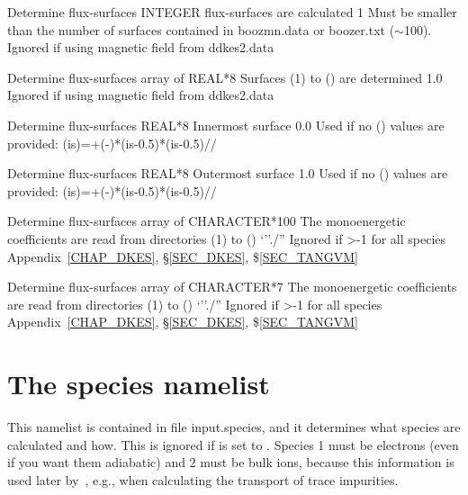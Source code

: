 {
{Determine flux-surfaces}
{INTEGER}
{ flux-surfaces are calculated}
{1}%
{Must be smaller than the number of surfaces contained in {\ttfamily boozmn.data} or {\ttfamily boozer.txt} ($\sim$100). Ignored if using magnetic field from {\ttfamily ddkes2.data}}
{}

{Determine flux-surfaces}
{array of REAL*8}
{Surfaces (1) to () are determined}
{1.0}%
{Ignored if using magnetic field from {\ttfamily ddkes2.data}}
{}

{Determine flux-surfaces}
{REAL*8}
{Innermost surface}
{0.0}%
{Used if no () values are provided: (is)=+(-)*(is-0.5)*(is-0.5)//}
{}

{Determine flux-surfaces}
{REAL*8}
{Outermost surface}
{1.0}%
{Used if no () values are provided: (is)=+(-)*(is-0.5)*(is-0.5)//}
{}

{Determine flux-surfaces}
{array of CHARACTER*100}
{The monoenergetic coefficients are read from directories (1) to ()}
{`''./''}
{Ignored if >-1 for all species}
{Appendix~\ref{CHAP_DKES}, \S\ref{SEC_DKES}, \$\ref{SEC_TANGVM}}
  
{Determine flux-surfaces}
{array of CHARACTER*7}
{The monoenergetic coefficients are read from directories (1) to ()}
{`''./''}
{Ignored if >-1 for all species}
{Appendix~\ref{CHAP_DKES}, \S\ref{SEC_DKES}, \$\ref{SEC_TANGVM}}



\section{The {\ttfamily species} namelist}\label{SEC_SPE}

This namelist is contained in file {\ttfamily input.species}, and it determines what species are calculated and how. This is ignored if  is set to \true. Species 1 must be electrons (even if you want them adiabatic) and 2 must be bulk ions, because this information is used later by~\KNOSOS, e.g., when calculating the transport of trace impurities. 
 

}
